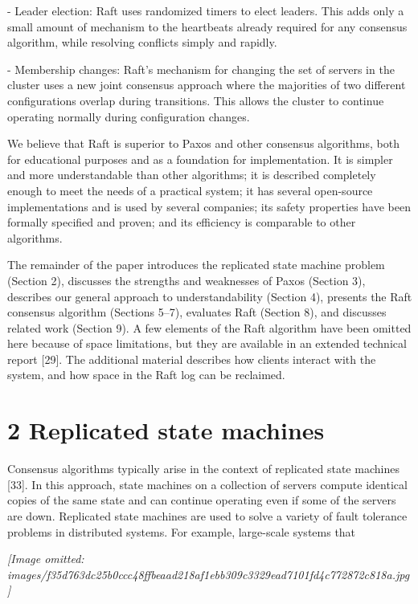 \documentclass[
]{article}
\begin{document}
- Leader election: Raft uses randomized timers to elect leaders. This
adds only a small amount of mechanism to the heartbeats already required
for any consensus algorithm, while resolving conflicts simply and
rapidly.

- Membership changes: Raft's mechanism for changing the set of servers
in the cluster uses a new joint consensus approach where the majorities
of two different configurations overlap during transitions. This allows
the cluster to continue operating normally during configuration changes.

We believe that Raft is superior to Paxos and other consensus
algorithms, both for educational purposes and as a foundation for
implementation. It is simpler and more understandable than other
algorithms; it is described completely enough to meet the needs of a
practical system; it has several open-source implementations and is used
by several companies; its safety properties have been formally specified
and proven; and its efficiency is comparable to other algorithms.

The remainder of the paper introduces the replicated state machine
problem (Section 2), discusses the strengths and weaknesses of Paxos
(Section 3), describes our general approach to understandability
(Section 4), presents the Raft consensus algorithm (Sections 5--7),
evaluates Raft (Section 8), and discusses related work (Section 9). A
few elements of the Raft algorithm have been omitted here because of
space limitations, but they are available in an extended technical
report {[}29{]}. The additional material describes how clients interact
with the system, and how space in the Raft log can be reclaimed.

\section{2 Replicated state machines}\label{replicated-state-machines}

Consensus algorithms typically arise in the context of replicated state
machines {[}33{]}. In this approach, state machines on a collection of
servers compute identical copies of the same state and can continue
operating even if some of the servers are down. Replicated state
machines are used to solve a variety of fault tolerance problems in
distributed systems. For example, large-scale systems that

\textit{[Image omitted: images/f35d763dc25b0ccc48ffbeaad218af1ebb309c3329ead7101fd4c772872c818a.jpg]}
\end{document}
